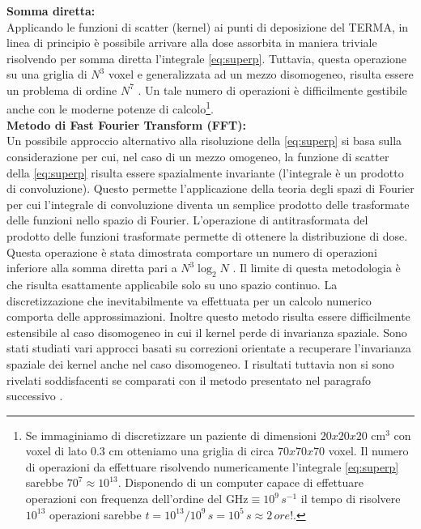 {\textbf{Somma diretta:\\}
Applicando le funzioni di scatter (kernel) ai punti di deposizione del TERMA, in linea di principio è possibile arrivare alla dose assorbita in maniera triviale risolvendo per somma diretta l'integrale \eqref{eq:superp}. Tuttavia, questa operazione su una griglia di $N^3$ voxel e generalizzata ad un mezzo disomogeneo, risulta essere un problema  di ordine $N^7$ \cite{Ahnesjo1989}. Un tale numero di operazioni è difficilmente gestibile anche con le moderne potenze di calcolo\footnote{Se immaginiamo di discretizzare un paziente di dimensioni $20x20x20$ cm$^3$ con voxel di lato $0.3$ cm otteniamo una griglia di circa $70x70x70$ voxel. Il numero di operazioni da effettuare risolvendo numericamente l'integrale \eqref{eq:superp} sarebbe $70^7\approx 10^{13}$. Disponendo di un computer capace di effettuare operazioni con frequenza dell'ordine del GHz$\equiv 10^9\,s^{-1}$ il tempo di risolvere $10^{13}$ operazioni sarebbe $t=10^{13}/10^9\,s=10^5\,s\approx 2\, ore!$.}. \\

\textbf{Metodo di Fast Fourier Transform (FFT):\\}
Un possibile approccio alternativo alla risoluzione della \eqref{eq:superp} si basa sulla considerazione per cui, nel caso di un mezzo omogeneo, la funzione di scatter della \eqref{eq:superp} risulta essere spazialmente invariante (l'integrale è un prodotto di convoluzione). Questo permette l'applicazione della teoria degli spazi di Fourier per cui l'integrale di convoluzione  diventa un semplice prodotto delle trasformate delle funzioni nello spazio di Fourier. L'operazione di antitrasformata del prodotto delle funzioni trasformate permette di ottenere la distribuzione di dose. Questa operazione è stata dimostrata comportare un numero di operazioni inferiore alla somma diretta pari a $N^3\log_2 N$ \cite{Wong1996}. Il limite di questa metodologia è che risulta esattamente applicabile solo su uno spazio continuo. La discretizzazione che inevitabilmente va effettuata per un calcolo numerico comporta delle approssimazioni. Inoltre questo metodo risulta essere difficilmente estensibile al caso disomogeneo in cui il kernel perde di invarianza spaziale. Sono stati studiati vari approcci basati su correzioni orientate a recuperare l'invarianza spaziale dei kernel anche nel caso disomogeneo. I risultati tuttavia non si sono rivelati soddisfacenti se comparati con il metodo presentato nel paragrafo successivo \cite{Wong1996}.\\

}
